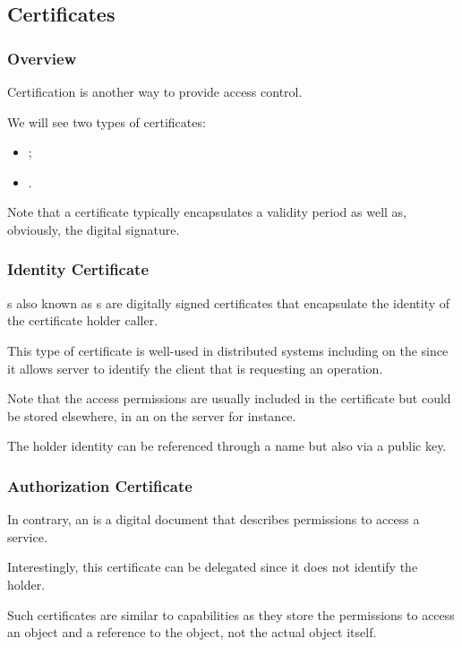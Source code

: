 
\subsection{Certificates}


\begin{frame}
  \frametitle{Overview}

  Certification is another way to provide access control.

  \-

  We will see two types of certificates:

  \begin{itemize}
    \item
      ;
    \item
      .
  \end{itemize}

  \-

  Note that a certificate typically encapsulates a validity period as well
  as, obviously, the digital signature.
\end{frame}


\begin{frame}
  \frametitle{Identity Certificate}

  s also known as s are digitally signed certificates that encapsulate the
  identity of the certificate holder \ie{} caller.

  \-

  This type of certificate is well-used in distributed systems including
  on the  since it allows server to identify the client that
  is requesting an operation.

  \-

  Note that the access permissions are usually included in the certificate
  but could be stored elsewhere, in an  on the
  server for instance.

  \-

  The holder identity can be referenced through a name but also via a
  public key.
\end{frame}


\begin{frame}
  \frametitle{Authorization Certificate}

  In contrary, an  is a digital document
  that describes permissions to access a service.

  \-

  Interestingly, this certificate can be delegated since it does not
  identify the holder.

  \-

  Such certificates are similar to capabilities as they store the permissions
  to access an object and a reference to the object, not the actual object
  itself.
\end{frame}

